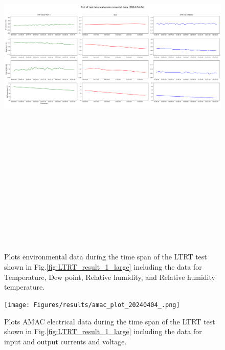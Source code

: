 \begin{figure}
    \centering
    \includegraphics[width=25cm,height=20cm,keepaspectratio]{Figures/results/env_plot_20240404_.png}
    \caption{Plots environmental data during the time span of the LTRT test shown in Fig.\ref{fig:LTRT_result_1_large} including the data for Temperature, Dew point, Relative humidity, and Relative humidity temperature.}
    \label{fig:env_1_large}
\end{figure}

\begin{figure}
    \centering
    \texttt{[image: Figures/results/amac\_plot\_20240404\_.png]}
    \caption{Plots AMAC electrical data during the time span of the LTRT test shown in Fig.\ref{fig:LTRT_result_1_large} including the data for input and output currents and voltage.}
    \label{fig:amac_1_large}
\end{figure}